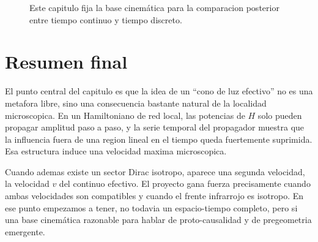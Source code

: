 \begin{figure}[h!]
\centering
{}
\caption{Este capitulo fija la base cinemática para la comparacion posterior entre tiempo continuo y tiempo discreto.}
\end{figure}

\section{Resumen final}
El punto central del capitulo es que la idea de un \enquote{cono de luz efectivo} no es una metafora libre, sino una consecuencia bastante natural de la localidad microscopica. En un Hamiltoniano de red local, las potencias de \(H\) solo pueden propagar amplitud paso a paso, y la serie temporal del propagador muestra que la influencia fuera de una region lineal en el tiempo queda fuertemente suprimida. Esa estructura induce una velocidad maxima microscopica.

Cuando ademas existe un sector Dirac isotropo, aparece una segunda velocidad, la velocidad \(v\) del continuo efectivo. El proyecto gana fuerza precisamente cuando ambas velocidades son compatibles y cuando el frente infrarrojo es isotropo. En ese punto empezamos a tener, no todavia un espacio-tiempo completo, pero si una base cinemática razonable para hablar de proto-causalidad y de pregeometria emergente.
